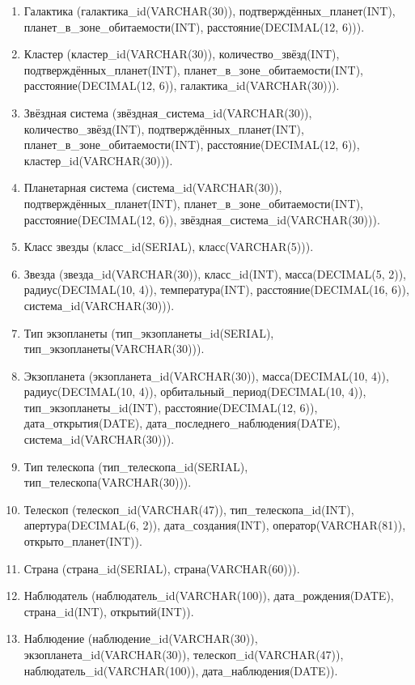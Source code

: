 \documentclass[14pt,a4paper]{extarticle}
\begin{document}
\begin{enumerate}
    \item Галактика (галактика\_id(VARCHAR(30)), подтверждённых\_планет(INT), планет\_в\_зоне\_обитаемости(INT), расстояние(DECIMAL(12, 6))).

    \item Кластер (кластер\_id(VARCHAR(30)), количество\_звёзд(INT), подтверждённых\_планет(INT), планет\_в\_зоне\_обитаемости(INT), расстояние(DECIMAL(12, 6)), галактика\_id(VARCHAR(30))).

    \item Звёздная система (звёздная\_система\_id(VARCHAR(30)), количество\_звёзд(INT), подтверждённых\_планет(INT), планет\_в\_зоне\_обитаемости(INT), расстояние(DECIMAL(12, 6)), кластер\_id(VARCHAR(30))).

    \item Планетарная система (система\_id(VARCHAR(30)), подтверждённых\_планет(INT), планет\_в\_зоне\_обитаемости(INT), расстояние(DECIMAL(12, 6)), звёздная\_система\_id(VARCHAR(30))).

    \item Класс звезды (класс\_id(SERIAL), класс(VARCHAR(5))).

    \item Звезда (звезда\_id(VARCHAR(30)), класс\_id(INT), масса(DECIMAL(5, 2)), радиус(DECIMAL(10, 4)), температура(INT), расстояние(DECIMAL(16, 6)), система\_id(VARCHAR(30))).

    \item Тип экзопланеты (тип\_экзопланеты\_id(SERIAL), тип\_экзопланеты(VARCHAR(30))).

    \item Экзопланета (экзопланета\_id(VARCHAR(30)), масса(DECIMAL(10, 4)), радиус(DECIMAL(10, 4)), орбитальный\_период(DECIMAL(10, 4)), тип\_экзопланеты\_id(INT), расстояние(DECIMAL(12, 6)), дата\_открытия(DATE), дата\_последнего\_наблюдения(DATE), система\_id(VARCHAR(30))).

    \item Тип телескопа (тип\_телескопа\_id(SERIAL), тип\_телескопа(VARCHAR(30))).

    \item Телескоп (телескоп\_id(VARCHAR(47)), тип\_телескопа\_id(INT), апертура(DECIMAL(6, 2)), дата\_создания(INT), оператор(VARCHAR(81)), открыто\_планет(INT)).

    \item Страна (страна\_id(SERIAL), страна(VARCHAR(60))).

    \item Наблюдатель (наблюдатель\_id(VARCHAR(100)), дата\_рождения(DATE), страна\_id(INT), открытий(INT)).

    \item Наблюдение (наблюдение\_id(VARCHAR(30)), экзопланета\_id(VARCHAR(30)), телескоп\_id(VARCHAR(47)), наблюдатель\_id(VARCHAR(100)), дата\_наблюдения(DATE)).
\end{enumerate}
\end{document}
